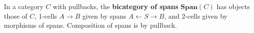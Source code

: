 In a category $C$ with pullbacks, the \textbf{bicategory of spans} $\mathbf{Span}(C)$ has objects those of $C$, 1-cells $A \rightarrow B$ given by spans $A \leftarrow S \rightarrow B$, and 2-cells given by morphisms of spans. Composition of spans is by pullback.